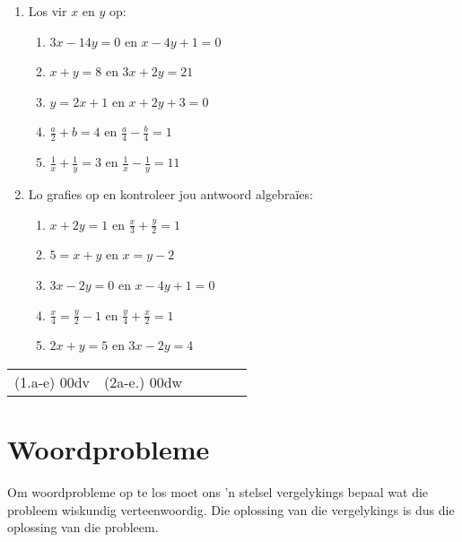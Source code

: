 \begin{exercises}{}
{
\begin{enumerate}[noitemsep, label=\textbf{\arabic*}. ] 
\item Los vir $x$ en $y$ op: 
\begin{enumerate}[noitemsep, label=\textbf{(\alph*)} ] 
\item $3x-14y=0$ en $x-4y+1=0$
\item $x+y=8$ en $3x + 2y = 21$
\item $y=2x+1$ en $x + 2y + 3 = 0$
\item $\frac{a}{2}+b=4$ en $\frac{a}{4} -\frac{b}{4}=1$
\item $\frac{1}{x}+\frac{1}{y}=3$ en $\frac{1}{x}-\frac{1}{y}=11$
\end{enumerate}

\item Lo grafies op en kontroleer jou antwoord algebraïes:

\begin{enumerate}[noitemsep, label=\textbf{(\alph*)} ] 

\item  $x+2y=1$ en $\frac{x}{3} + \frac{y}{2} = 1$
\item $5= x+y$ en $x = y-2$
\item $3x - 2y = 0$ en $x - 4y + 1 = 0$
\item $\frac{x}{4}=\frac{y}{2}-1$  en $\frac{y}{4}+\frac{x}{2}=1$
\item $2x+y=5$ en $3x-2y=4$
\end{enumerate}
\end{enumerate}
\practiceinfo
\par 
\par \begin{tabular}[h]{cccccc}
(1.a-e) 00dv&  (2a-e.) 00dw & \end{tabular}
}
\end{exercises}

\section{Woordprobleme}

Om woordprobleme op te los moet ons 'n stelsel vergelykings bepaal wat die probleem wiskundig verteenwoordig. Die oplossing van die vergelykings is dus die oplossing van die probleem.


